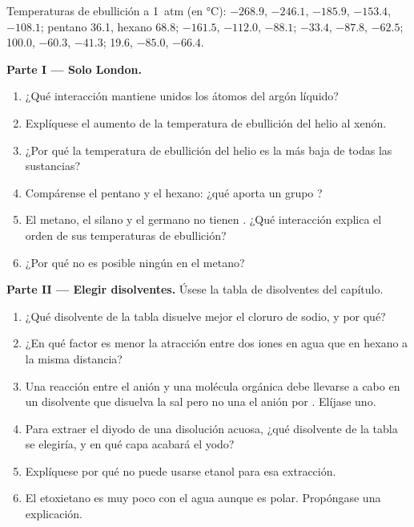 \begin{problem}
\label{pb:b1:intermolecular-forces-solvents:1}
Temperaturas de ebullición a \qty{1}{atm} (en \unit{\celsius}):  $-268.9$,
 $-246.1$,  $-185.9$,  $-153.4$,  $-108.1$;
pentano 36.1, hexano 68.8;  $-161.5$,  $-112.0$,
 $-88.1$;  $-33.4$,  $-87.8$,  $-62.5$;
 100.0,  $-60.3$,  $-41.3$;  19.6,
 $-85.0$,  $-66.4$.

\medskip
\noindent\textbf{Parte I --- Solo London.}
\begin{enumerate}
  \item ¿Qué interacción mantiene unidos los átomos del argón líquido?
  \item Explíquese el aumento de la temperatura de ebullición del helio
        al xenón.
  \item ¿Por qué la temperatura de ebullición del helio es la más baja de
        todas las sustancias?
  \item Compárense el pentano y el hexano: ¿qué aporta un grupo ?
  \item El metano, el silano y el germano no tienen . ¿Qué
        interacción explica el orden de sus temperaturas de ebullición?
  \item ¿Por qué no es posible ningún  en el metano?
\end{enumerate}

\medskip
\noindent\textbf{Parte II --- Elegir disolventes.}
Úsese la tabla de disolventes del capítulo.
\begin{enumerate}[resume]
  \item ¿Qué disolvente de la tabla disuelve mejor el cloruro de sodio, y
        por qué?
  \item ¿En qué factor es menor la atracción entre dos iones en agua que
        en hexano a la misma distancia?
  \item Una reacción entre el anión  y una molécula orgánica debe
        llevarse a cabo en un disolvente que disuelva la sal pero no una
        el anión por . Elíjase uno.
  \item Para extraer el diyodo de una disolución acuosa, ¿qué disolvente
        de la tabla se elegiría, y en qué capa acabará el yodo?
  \item Explíquese por qué no puede usarse etanol para esa extracción.
  \item El etoxietano es muy poco  con el agua aunque es polar.
        Propóngase una explicación.
\end{enumerate}


\end{problem}
